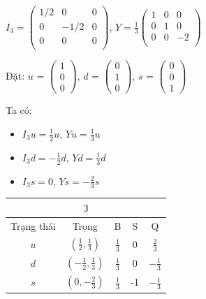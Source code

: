 \documentclass{report}
\begin{document}
	\begin{center}
		\( I_{3} = \begin{pmatrix}
			1/2 & 0 & 0 \\
			0 & -1/2 & 0 \\
			0 & 0 & 0 \\
		\end{pmatrix} \), \hspace*{1cm} \( Y = \frac{1}{3} \begin{pmatrix}
			1 & 0 & 0 \\
			0 & 1 & 0 \\
			0 & 0 & -2 \\
		\end{pmatrix} \)
	\end{center}
	
Đặt: \( u \) = \( \begin{pmatrix}
			1 \\ 0 \\ 0
		\end{pmatrix} \), \( d \) = \( \begin{pmatrix}
			0 \\ 1 \\ 0
		\end{pmatrix} \), \( s \) = \( \begin{pmatrix}
			0 \\ 0 \\ 1
		\end{pmatrix} \)
		
Ta có:
	\begin{itemize}
		\item \( I_{3} u = \frac{1}{2} u \), \hspace*{0.7cm} \( Y u = \frac{1}{3}	u \)
		\item \( I_{3} d = - \frac{1}{2} d \), \hspace*{0.5cm} \( Y d = \frac{1}{3}	d \)
		\item \( I_{3} s = 0 \), \hspace*{1cm} \( Y s = - \frac{2}{3}	s \)
	\end{itemize}		
		
	\begin{center}
		\begin{tabular}{ |c|c|c|c|c|  }
			\hline
				\multicolumn{5}{|c|}{\( \mathbb{3} \)} \\
			\hline	
 				Trạng thái & Trọng & B & S & Q \\
 			\hline
 				\( u \) & \( \left( \frac{1}{2}, \frac{1}{3} \right) \) & \( \frac{1}{3} \) & 0 & \( \frac{2}{3} \) \\ 	
			\hline
 				\( d \) & \( \left( - \frac{1}{2}, \frac{1}{3} \right) \) & \( \frac{1}{3} \) & 0 & \( - \frac{1}{3} \) \\ 	
			\hline
				\( s \) & \( \left( 0, - \frac{2}{3} \right) \) & \( \frac{1}{3} \) & -1 & \( - \frac{1}{3} \) \\ 	
			\hline
	\end{tabular}
	\end{center}
\end{document}
